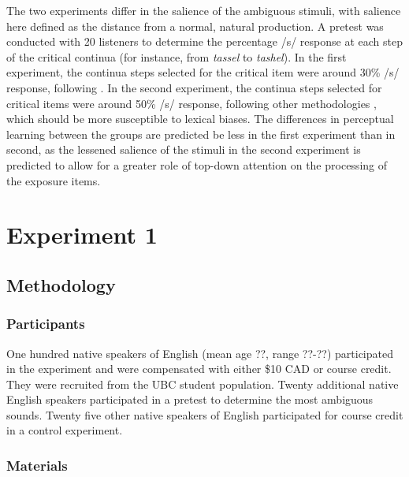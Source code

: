 The two experiments differ in the salience of the ambiguous stimuli, with salience here defined as the distance from a normal, natural production.  A pretest was conducted with 20 listeners to determine the percentage /s/ response at each step of the critical continua (for instance, from \emph{tassel} to \emph{tashel}).  In the first experiment, the continua steps selected for the critical item  were around 30\% /s/ response, following \citet{Reinisch2013}.  In the second experiment, the continua steps selected for critical items were around 50\% /s/ response, following other methodologies \citep{Norris2003,Kraljic2005}, which should be more susceptible to lexical biases.  The differences in perceptual learning between the groups are predicted be less in the first experiment than in second, as the lessened salience of the stimuli in the second experiment is predicted to allow for a greater role of top-down attention on the processing of the exposure items.

\section{Experiment 1}

\subsection{Methodology}

\subsubsection{Participants}

One hundred native speakers of English (mean age ??, range ??-??) participated in the experiment and were compensated with either \$10 CAD or course credit. They were recruited from the UBC student population.  Twenty additional native English speakers participated in a pretest to determine the most ambiguous sounds.  Twenty five other native speakers of English participated for course credit in a control experiment.

\subsubsection{Materials}

